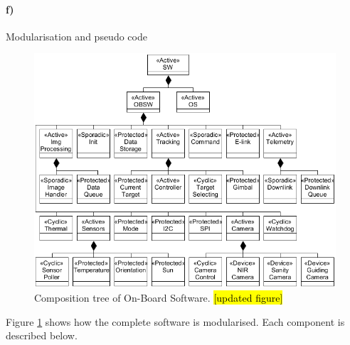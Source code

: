 \clearpage
\paragraph{f)} Modularisation and pseudo code

\begin{figure}[H]
	\centering
	\includegraphics[width=\textwidth]{4-experiment-design/img/software/composition-tree.png}
	\caption{Composition tree of On-Board Software. \hl{[updated figure]}}
	\label{fig:software-composition-tree}
\end{figure}

Figure \ref{fig:software-composition-tree} shows how the complete software is modularised. Each component is described below.

